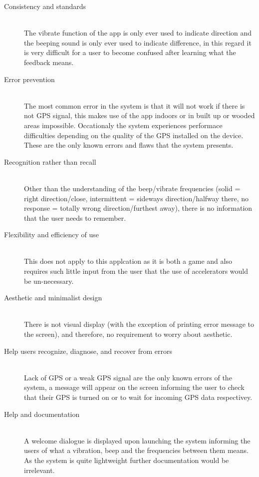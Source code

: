 \documentclass[12pt]{article} %
\begin{document}
\begin{description}
\item[Consistency and standards] \hfill \\
The vibrate function of the app is only ever used to indicate direction and the beeping sound is
only ever used to indicate difference, in this regard it is very difficult for a user to become
confused after learning what the feedback means.

\item[Error prevention] \hfill \\
The most common error in the system is that it will not work if there is not GPS signal, this makes
use of the app indoors or in built up or wooded areas impossible. Occationaly the system experiences
performace difficulties depending on the quality of the GPS installed on the device. These are the
only known errors and flaws that the system presents.

\item[Recognition rather than recall] \hfill \\
Other than the understanding of the beep/vibrate frequencies (solid = right direction/close,
intermittent = sideways direction/halfway there, no response = totally wrong direction/furthest
away), there is no information that the user needs to remember.

\item[Flexibility and efficiency of use] \hfill \\
This does not apply to this applcation as it is both a game and also requires such little input
from the user that the use of accelerators would be un-necessary.

\item[Aesthetic and minimalist design] \hfill \\
There is not visual display (with the exception of printing error message to the screen), and
therefore, no requirement to worry about aesthetic.

\item[Help users recognize, diagnose, and recover from errors] \hfill \\
Lack of GPS or a weak GPS signal are the only known errors of the system, a message will appear on
the screen informing the user to check that their GPS is turned on or to wait for incoming GPS data
respectivey.

\item[Help and documentation] \hfill \\
A welcome dialogue is displayed upon launching the system informing the users of what a vibration,
beep and the frequencies between them means. As the system is quite lightweight further
documentation would be irrelevant.
\end{description}
\end{document}
